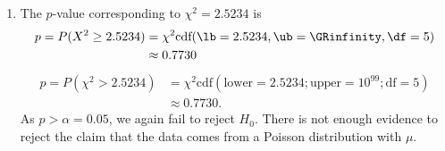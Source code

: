 {\begin{enumerate}[label=(\alph*)]
        \item The $p$-value corresponding to $\chi^2 = 2.5234$ is
        \begin{align*}
            p = P(X^2 \geq 2.5234) &= \chi^2\text{cdf}(\lb=2.5234, \ub=\GRinfinity, \df=5)\\
                                    &\approx 0.7730
        \end{align*}
        \begin{align*}
            p = P(\chi^2 > 2.5234) &= \chi^2\text{cdf}(\text{lower}=2.5234; \text{upper}=10^{99}; \text{df}=5) \\
                                             &\approx 0.7730.   
        \end{align*}
        As $p > \alpha = 0.05$, we again fail to reject $H_0$.
        There is not enough evidence to reject the claim that the data comes from a Poisson distribution with $\mu$.
    \end{enumerate}
}

